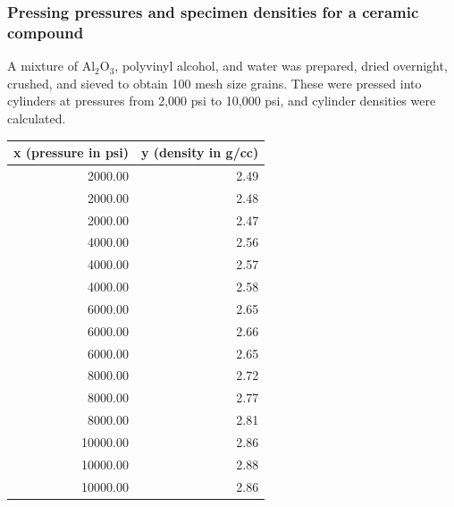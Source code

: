 \documentclass[handout]{beamer}\usepackage{graphicx, color}
\numberwithin{equation}{section}
\begin{document}
\begin{frame}[fragile]
\frametitle{\small Pressing pressures and specimen densities for a ceramic compound}
\scriptsize
A mixture of $\text{Al}_2\text{O}_3$, polyvinyl alcohol, and water was prepared, dried overnight, crushed, and sieved to obtain 100 mesh size grains. These were pressed into cylinders at pressures from 2,000 psi to 10,000 psi, and cylinder densities were calculated. 

\begin{table}[ht]
\centering
\begin{tabular}{rr}
 x (pressure in psi) & y (density in g/cc) \\ 
  \hline
2000.00 & 2.49 \\ 
  2000.00 & 2.48 \\ 
  2000.00 & 2.47 \\ 
  4000.00 & 2.56 \\ 
  4000.00 & 2.57 \\ 
  4000.00 & 2.58 \\ 
  6000.00 & 2.65 \\ 
  6000.00 & 2.66 \\ 
  6000.00 & 2.65 \\ 
  8000.00 & 2.72 \\ 
  8000.00 & 2.77 \\ 
  8000.00 & 2.81 \\ 
  10000.00 & 2.86 \\ 
  10000.00 & 2.88 \\ 
  10000.00 & 2.86 \\ 
  \end{tabular}
\end{table}



\end{frame}
\end{document}
